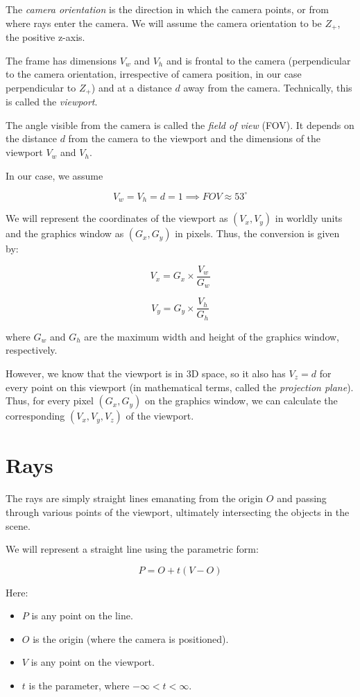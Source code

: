 \documentclass[conference]{IEEEtran}
\begin{document}
The \textit{camera orientation}\cite{peter} is the direction in which the camera points, or from where rays enter the camera. We will assume the camera orientation to be $Z_+$, the positive z-axis.

The frame has dimensions $V_w$ and $V_h$ and is frontal to the camera (perpendicular to the camera orientation, irrespective of camera position, in our case perpendicular to $Z_+$) and at a distance $d$ away from the camera. Technically, this is called the \textit{viewport}\cite{peter}.

The angle visible from the camera is called the \textit{field of view} (FOV).\cite{peter} It depends on the distance $d$ from the camera to the viewport and the dimensions of the viewport $V_w$ and $V_h$.

In our case, we assume 

$$V_w = V_h = d = 1 \implies FOV \approx 53^\circ$$

We will represent the coordinates of the viewport as $(V_x,V_y)$ in worldly units and the graphics window as $(G_x,G_y)$ in pixels. Thus, the conversion is given by:

$$V_x = G_x \times \frac{V_w}{G_w}$$

$$V_y = G_y \times \frac{V_h}{G_h}$$

where $G_w$ and $G_h$ are the maximum width and height of the graphics window, respectively.

However, we know that the viewport is in 3D space, so it also has $V_z = d$ for every point on this viewport (in mathematical terms, called the \textit{projection plane}). \\
Thus, for every pixel $(G_x, G_y)$ on the graphics window, we can calculate the corresponding $(V_x, V_y, V_z)$ of the viewport.

\section{Rays}

The rays are simply straight lines emanating from the origin $O$ and passing through various points of the viewport, ultimately intersecting the objects in the scene.

We will represent a straight line using the parametric form:

$$P = O + t(V - O)$$

Here:
\begin{itemize}
    \item $P$ is any point on the line.
    \item $O$ is the origin (where the camera is positioned).
    \item $V$ is any point on the viewport.
    \item $t$ is the parameter, where $-\infty < t < \infty$.
\end{itemize}
\end{document}
